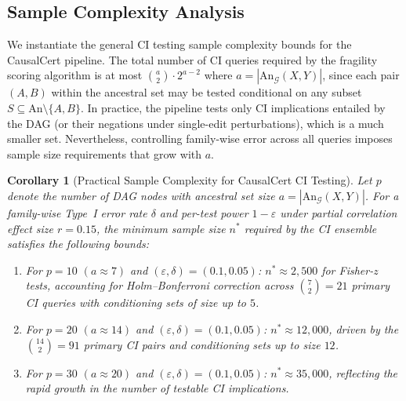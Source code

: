 \documentclass[11pt,a4paper]{article}
\newtheorem{corollary}[theorem]{Corollary}
\theoremstyle{definition}
\theoremstyle{remark}
\newcommand{\DAG}{\mathcal{G}}
\newcommand{\An}{\mathrm{An}}
\begin{document}
\subsection{Sample Complexity Analysis}\label{sec:sample_complexity}

We instantiate the general CI testing sample complexity bounds for the
CausalCert pipeline. The total number of CI queries required by the
fragility scoring algorithm is at most $\binom{a}{2} \cdot 2^{a-2}$
where $a = |\An_\DAG(X,Y)|$, since each pair $(A,B)$ within the
ancestral set may be tested conditional on any subset
$S \subseteq \An \setminus \{A,B\}$. In practice, the pipeline tests
only CI implications entailed by the DAG (or their negations under
single-edit perturbations), which is a much smaller set. Nevertheless,
controlling family-wise error across all queries imposes sample size
requirements that grow with $a$.

\begin{corollary}[Practical Sample Complexity for CausalCert CI Testing]\label{cor:sample_complexity}
Let $p$ denote the number of DAG nodes with ancestral set size
$a = |\An_\DAG(X,Y)|$. For a family-wise Type~I error rate
$\delta$ and per-test power $1 - \varepsilon$ under partial correlation
effect size $r = 0.15$, the minimum sample size $n^*$ required by the
CI ensemble satisfies the following bounds:
\begin{enumerate}[label=(\roman*)]
  \item For $p = 10$ $(a \approx 7)$ and $(\varepsilon, \delta) = (0.1, 0.05)$:
    $n^* \approx 2{,}500$ for Fisher-$z$ tests, accounting for
    Holm--Bonferroni correction across $\binom{7}{2} = 21$ primary CI
    queries with conditioning sets of size up to $5$.
  \item For $p = 20$ $(a \approx 14)$ and $(\varepsilon, \delta) = (0.1, 0.05)$:
    $n^* \approx 12{,}000$, driven by the $\binom{14}{2} = 91$ primary
    CI pairs and conditioning sets up to size $12$.
  \item For $p = 30$ $(a \approx 20)$ and $(\varepsilon, \delta) = (0.1, 0.05)$:
    $n^* \approx 35{,}000$, reflecting the rapid growth in the number of
    testable CI implications.
\end{enumerate}
\end{corollary}
\end{document}

